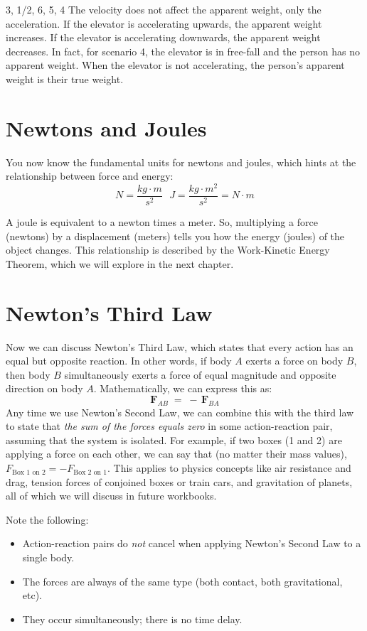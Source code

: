 \begin{Answer}[ref = elevator]
3, 1/2, 6, 5, 4
The velocity does not affect the apparent weight, only the acceleration. If the 
elevator is accelerating upwards, the apparent weight increases. If the elevator 
is accelerating downwards, the apparent weight decreases. In fact, for scenario 
4, the elevator is in free-fall and the person has no apparent weight. When the 
elevator is not accelerating, the person's apparent weight is their true weight. 
\end{Answer}


\section{Newtons and Joules}
You now know the fundamental units for newtons and joules, which hints at the 
relationship between force and energy:
$$N = \frac{kg \cdot m}{s^2} \text{     } J = \frac{kg \cdot m^2}{s^2} = N \cdot m$$

A joule is equivalent to a newton times a meter. So, multiplying a force 
(newtons) by a displacement (meters) tells you how the energy (joules) of the 
object changes. This relationship is described by the Work-Kinetic Energy Theorem, 
which we will explore in the next chapter. 

\section{Newton's Third Law}
Now we can discuss Newton's Third Law, which states that every action has an equal but opposite reaction. 
In other words, if body \(A\) exerts a force on body \(B\), then body \(B\) simultaneously 
exerts a force of equal magnitude and opposite direction on body \(A\).
Mathematically, we can express this as:
\[
    \mathbf{F}_{\!AB} \;=\; -\,\mathbf{F}_{\!BA}
\]
Any time we use Newton's Second Law, we can combine this with the third law to state that 
\emph{the sum of the forces equals zero} in some action-reaction pair, assuming that the system is isolated. For example, if two boxes (1 and 2) are 
applying a force on each other, we can say that (no matter their mass values), $F_{\text{Box 1 on 2}} = -F_{\text{Box 2 on 1}}$.
This applies to physics concepts like air resistance and drag, tension forces of conjoined boxes or train cars, and gravitation 
of planets, all of which we will discuss in future workbooks. 

Note the following:
\begin{itemize}
    \item Action-reaction pairs do \emph{not} cancel when applying Newton's Second Law to a single body.
    \item The forces are always of the same type (both contact, both gravitational, etc).
    \item They occur simultaneously; there is no time delay.
\end{itemize}

